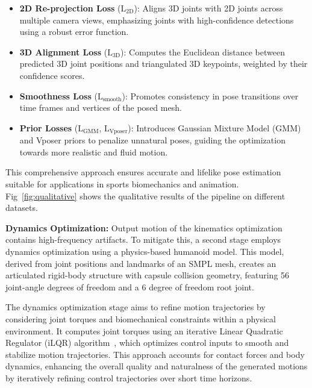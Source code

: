 \documentclass{egpubl}
\begin{document}
\begin{itemize}
    \item \textbf{2D Re-projection Loss} ($\mathrm{L}_\text{2D}$): Aligns 3D joints with 2D joints across multiple camera views, emphasizing joints with high-confidence detections using a robust error function.
    \item \textbf{3D Alignment Loss} ($\mathrm{L}_\text{3D}$): Computes the Euclidean distance between predicted 3D joint positions and triangulated 3D keypoints, weighted by their confidence scores.
    \item \textbf{Smoothness Loss} ($\mathrm{L}_\text{smooth}$): Promotes consistency in pose transitions over time frames and vertices of the posed mesh.
    \item \textbf{Prior Losses} ($\mathrm{L}_{\text{GMM}}$, $\mathrm{L}_{\text{Vposer}}$): Introduces Gaussian Mixture Model (GMM) and Vposer priors to penalize unnatural poses, guiding the optimization towards more realistic and fluid motion.
\end{itemize}
 This comprehensive approach ensures accurate and lifelike pose estimation suitable for applications in sports biomechanics and animation. Fig~\ref{fig:qualitative} shows the qualitative results of the pipeline on different datasets.


\textbf{Dynamics Optimization:} Output motion of the kinematics optimization contains high-frequency artifacts. To mitigate this, a second stage employs dynamics optimization using a physics-based humanoid model. This model, derived from joint positions and landmarks of an SMPL mesh, creates an articulated rigid-body structure with capsule collision geometry, featuring 56 joint-angle degrees of freedom and a 6 degree of freedom root joint.

The dynamics optimization stage aims to refine motion trajectories by considering joint torques and biomechanical constraints within a physical environment. It computes joint torques using an iterative Linear Quadratic Regulator (iLQR) algorithm~\cite{howell2022}, which optimizes control inputs to smooth and stabilize motion trajectories. This approach accounts for contact forces and body dynamics, enhancing the overall quality and naturalness of the generated motions by iteratively refining control trajectories over short time horizons.



 
 
\end{document}
